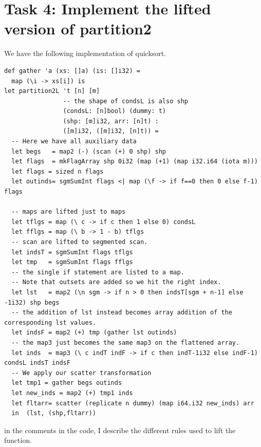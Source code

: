 \documentclass[a4paper,12pt]{article}
\begin{document}
\section*{Task 4: Implement the lifted version of \textmd{partition2}}
We have the following implementation of quicksort.
\begin{lstlisting}
def gather 'a (xs: []a) (is: []i32) =
  map (\i -> xs[i]) is
let partition2L 't [n] [m]
                -- the shape of condsL is also shp
                (condsL: [n]bool) (dummy: t)
                (shp: [m]i32, arr: [n]t) :
                ([m]i32, ([m]i32, [n]t)) =
  -- Here we have all auxiliary data
  let begs   = map2 (-) (scan (+) 0 shp) shp
  let flags  = mkFlagArray shp 0i32 (map (+1) (map i32.i64 (iota m)))
  let flags = sized n flags
  let outinds= sgmSumInt flags <| map (\f -> if f==0 then 0 else f-1) flags

  -- maps are lifted just to maps 
  let tflgs = map (\ c -> if c then 1 else 0) condsL
  let fflgs = map (\ b -> 1 - b) tflgs
  -- scan are lifted to segmented scan.
  let indsT = sgmSumInt flags tflgs
  let tmp   = sgmSumInt flags fflgs
  -- the single if statement are listed to a map.
  -- Note that outsets are added so we hit the right index.
  let lst   = map2 (\n sgm -> if n > 0 then indsT[sgm + n-1] else -1i32) shp begs
  -- the addition of lst instead becomes array addition of the corresponding lst values.
  let indsF = map2 (+) tmp (gather lst outinds)
  -- the map3 just becomes the same map3 on the flattened array.
  let inds  = map3 (\ c indT indF -> if c then indT-1i32 else indF-1) condsL indsT indsF
  -- We apply our scatter transformation
  let tmp1 = gather begs outinds
  let new_inds = map2 (+) tmp1 inds
  let fltarr= scatter (replicate n dummy) (map i64.i32 new_inds) arr
  in  (lst, (shp,fltarr))
\end{lstlisting}
in the comments in the code, I describe the different rules used to lift the
function.
\end{document}
